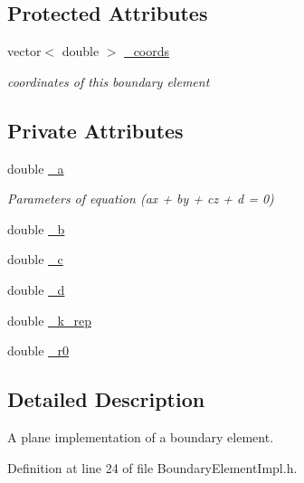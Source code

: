 \subsection*{Protected Attributes}
\begin{DoxyCompactItemize}
\item 
vector$<$ double $>$ \hyperlink{classBoundaryElement_ab51302e10e3e2def98438234ba5bf801}{\+\_\+coords}
\begin{DoxyCompactList}\small\item\em coordinates of this boundary element \end{DoxyCompactList}\end{DoxyCompactItemize}
\subsection*{Private Attributes}
\begin{DoxyCompactItemize}
\item 
double \hyperlink{classPlaneBoundaryElement_ad067a43fa80af86a71fa244024a3a92b}{\+\_\+a}
\begin{DoxyCompactList}\small\item\em Parameters of equation (ax + by + cz + d = 0) \end{DoxyCompactList}\item 
double \hyperlink{classPlaneBoundaryElement_a1725bf5a9d6a0d6df973bbf834f64afd}{\+\_\+b}
\item 
double \hyperlink{classPlaneBoundaryElement_ac76ace6d0b2da7e27cba5afd85ae8935}{\+\_\+c}
\item 
double \hyperlink{classPlaneBoundaryElement_a01c1e54fda120dba72c8cea1b3025ab7}{\+\_\+d}
\item 
double \hyperlink{classPlaneBoundaryElement_aaa66079ea34844957907160081ab3059}{\+\_\+k\+\_\+rep}
\item 
double \hyperlink{classPlaneBoundaryElement_a3638279689c7293ccce4d09946aa2dca}{\+\_\+r0}
\end{DoxyCompactItemize}


\subsection{Detailed Description}
A plane implementation of a boundary element. 

Definition at line 24 of file Boundary\+Element\+Impl.\+h.



